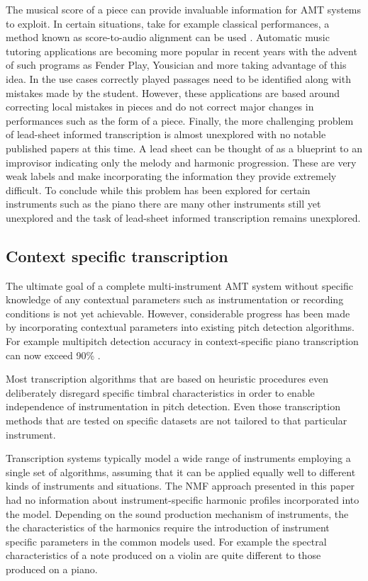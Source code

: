 The musical score of a piece can provide invaluable information for \ac{AMT} systems
to exploit. In certain situations, take for example classical performances, a
method known as score-to-audio alignment can be used \cite{Wang2017}. Automatic
music tutoring applications are becoming more popular in recent years with the
advent of such programs as Fender Play, Yousician and more taking advantage of
this idea. In the use cases correctly played passages need to be identified
along with mistakes made by the student. However, these applications are based
around correcting local mistakes in pieces and do not correct major changes in
performances such as the form of a piece.  Finally, the more challenging problem
of lead-sheet informed transcription is almost unexplored with no notable
published papers at this time. A lead sheet can be thought of as a blueprint to
an improvisor indicating only the melody and harmonic progression. These are
very weak labels and make incorporating the information they provide extremely
difficult. To conclude while this problem has been explored for certain
instruments such as the piano there are many other instruments still yet
unexplored and the task of lead-sheet informed transcription remains unexplored.

\subsection{Context specific transcription}

The ultimate goal of a complete multi-instrument \ac{AMT} system without specific
knowledge of any contextual parameters such as instrumentation or recording
conditions is not yet achievable. However, considerable progress has been made
by incorporating contextual parameters into existing pitch detection algorithms.
For example multipitch detection accuracy in context-specific piano
transcription can now exceed 90\% \cite{context-dependent2016:Cogliati}.

Most transcription algorithms that are based on heuristic procedures even
deliberately disregard specific timbral characteristics in order to enable
independence of instrumentation in pitch detection. Even those transcription
methods that are tested on specific datasets are not tailored to that particular
instrument.

Transcription systems typically model a wide range of instruments employing a
single set of algorithms, assuming that it can be applied equally well to
different kinds of instruments and situations. The \ac{NMF} approach presented in
this paper had no information about instrument-specific harmonic profiles
incorporated into the model. Depending on the sound production mechanism of
instruments, the the characteristics of the harmonics require the introduction
of instrument specific parameters in the common models used. For example the
spectral characteristics of a note produced on a violin are quite different to
those produced on a piano.

